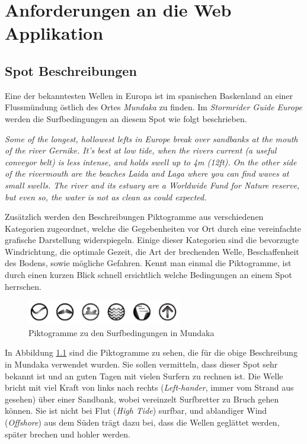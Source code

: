 
\chapter{Anforderungen an die Web Applikation}

\section{Spot Beschreibungen}

Eine der bekanntesten Wellen in Europa ist im spanischen Baskenland an
einer Fluss\-mündung östlich des Ortes \textit{Mundaka} zu finden. Im
\textit{Stormrider Guide Europe} \cite[S.180]{storm_europe_1998}
werden die Surfbedingungen an diesem Spot wie folgt beschrieben.

\textit{Some of the longest, hollowest lefts in Europe break over
  sandbanks at the mouth of the river Gernike. It's best at low tide,
  when the rivers current (a useful conveyor belt) is less intense,
  and holds swell up to 4m (12ft). On the other side of the rivermouth
  are the beaches Laida and Laga where you can find waves at small
  swells. The river and its estuary are a Worldwide Fund for Nature
  reserve, but even so, the water is not as clean as could expected.
}

Zusätzlich werden den Beschreibungen Piktogramme aus verschiedenen
Kategorien zugeordnet, welche die Gegebenheiten vor Ort durch eine
vereinfachte grafische Darstellung widerspiegeln. Einige dieser
Kategorien sind die bevorzugte Windrichtung, die optimale Gezeit, die
Art der brechenden Welle, Beschaffenheit des Bodens, sowie mögliche
Gefahren. Kennt man einmal die Piktogramme, ist durch einen kurzen
Blick schnell ersichtlich welche Bedingungen an einem Spot herrschen.

\begin{figure}[h]
  \begin{center}
    \includegraphics[height=40px]{bilder/mundaka-conditions}
    \caption{Piktogramme zu den Surfbedingungen in Mundaka}
    \label{piktogramm}
  \end{center}
\end{figure}


In Abbildung \ref{piktogramm} sind die Piktogramme zu sehen, die für
die obige Beschreibung in Mundaka verwendet wurden. Sie sollen
vermitteln, dass dieser Spot sehr bekannt ist und an guten Tagen mit
vielen Surfern zu rechnen ist. Die Welle bricht mit viel Kraft von
links nach rechts (\textit{Left-hander}, immer vom Strand aus gesehen)
über einer Sandbank, wobei vereinzelt Surfbretter zu Bruch gehen
können.  Sie ist nicht bei Flut (\textit{High Tide}) surfbar, und
ablandiger Wind (\textit{Offshore}) aus dem Süden trägt dazu bei, dass
die Wellen geglättet werden, später brechen und hohler werden.

